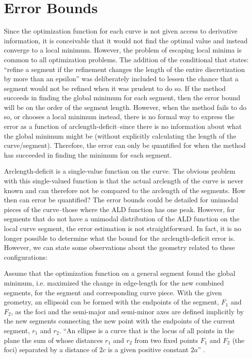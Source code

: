 \section{Error Bounds}
Since the optimization function for each curve is not given access to 
derivative information, it is conceivable that it would not find the 
optimal value and instead converge to a local minimum.  However, the 
problem of escaping local minima is common to all optimization problems.  
The addition of the conditional that states: ``refine a segment if the 
refinement changes the length of the entire discretization by more than an 
epsilon'' was deliberately included to lessen the chance that a segment 
would not be refined when it was prudent to do so.  If the method succeeds 
in finding the global minimum for each segment, then the error bound will 
be on the order of the segment length.  However, when the method fails to 
do so, or chooses a local minimum instead, there is no formal way to 
express the error as a function of arclength-deficit--since there is no 
information about what the global minimum might be (without explicitly 
calculating the length of the curve/segment).  Therefore, the error can 
only be quantified for when the method has succeeded in finding the 
minimum for each segment.

Arclength-deficit is a single-value function on the curve.  The obvious 
problem with this single-valued function is that the actual arclength of 
the curve is never known and can therefore not be compared to the 
arclength of the segments.  How then can error be quantified? The error 
bounds could be detailed for unimodal pieces of the curve--those where the 
ALD function has one peak.  However, for segments that do not have a 
unimodal distribution of the ALD function on the local curve segment, the 
error estimation is not straightforward.  In fact, it is no longer 
possible to determine what the bound for the arclength-deficit error is.  
However, we can state some observations about the geometry related to 
these configurations:

Assume that the optimization function on a general segment found the 
global minimum, i.e. maximized the change in edge-length for the new 
combined segments, for the segment and corresponding curve piece.  With 
the given geometry, an ellipsoid can be formed with the endpoints of the 
segment, $F_1$ and $F_2$, as the foci and the semi-major and semi-minor 
axes are defined implicitly by the new segments connecting the new point 
with the endpoints of the current segment, $r_1$ and $r_2$.  ``An ellipse 
is a curve that is the locus of all points in the plane the sum of whose 
distances $r_1$ and $r_2$ from two fixed points $F_1$ and $F_2$ (the foci) 
separated by a distance of $2c$ is a given positive constant $2a$'' 
\cite{weissteine}.

